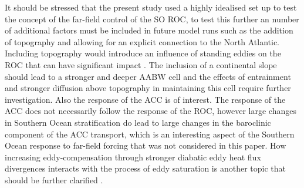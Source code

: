 It should be stressed that the present study used a highly idealised set up to test the concept of the far-field control of the SO ROC, to test this further an number of additional factors must be included in future model runs such as the addition of topography and allowing for an explicit connection to the North Atlantic. Including topography would introduce an influence of standing eddies on the ROC that can have significant impact \citep{abernathey2013}. The inclusion of a continental slope should lead to a stronger and deeper AABW cell and the effects of entrainment and stronger diffusion above topography in maintaining this cell require further investigation. 
Also the response of the ACC is of interest. The response of the ACC does not necessarily follow the response of the ROC, however large changes in Southern Ocean stratification do lead to large changes in the baroclinic component of the ACC transport, which is an interesting aspect of the Southern Ocean response to far-field forcing that was not considered in this paper.  
How increasing eddy-compensation through stronger diabatic eddy heat flux divergences interacts with the process of eddy saturation is another topic that should be further clarified \citep{Morrison2013}.